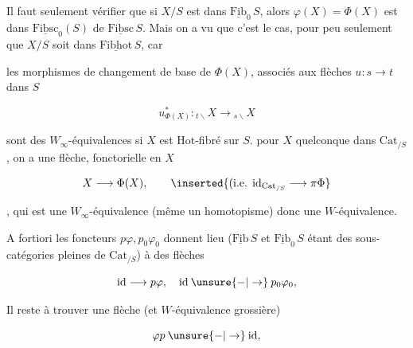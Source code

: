 Il faut seulement vérifier que si $X/S$ est dans $\underline{\mathrm{Fib}}_0\,S$, alors $\varphi(X)=\Phi(X)$ est dans  $\underline{\mathrm{Fibsc}}_0(S)$ de $\underline{\mathrm{Fibsc}}\,S$. Mais on a vu que c'est le cas, pour peu seulement que $X/S$ soit dans $\underline{\mathrm{Fibhot}}\,S$, car 


 les morphismes de changement de base de $\Phi(X)$, associés aux flèches $u:s\longrightarrow t$ dans $S$

\[
 u^*_{\Phi(X)}:{}_{t\backslash}X\longrightarrow{}_{s\backslash}X
\]

sont des $W_\infty$-équivalences si $X$ est $\mathrm{Hot}$-fibré sur $S$.   pour $X$ quelconque dans $\mathrm{Cat}_{/S}$, on a une flèche, fonctorielle en $X$

\[
 X\longrightarrow\Phi(X),\qquad\inserted{(\text{i.e. }\mathrm{id}_{\mathrm{Cat}_{/S}}\longrightarrow\pi\Phi}
\]

, qui est une $W_\infty$-équivalence (même un homotopisme) donc une $W$-équivalence.

A fortiori les foncteurs $p\varphi,p_0\varphi_0$ donnent lieu ($\underline{\mathrm{Fib}}\,S$ et $\underline{\mathrm{Fib}}_0\,S$ étant des sous-catégories pleines de $\mathrm{Cat}_{/S}$) à des flèches

\[
 \mathrm{id}\longrightarrow p\varphi,\quad\mathrm{id}\mathbin{\unsure{-|\to}}p_0\varphi_0,
\]

Il reste à trouver une flèche (et $W$-équivalence grossière)

\[
 \varphi p\mathbin{\unsure{-|\to}}\mathrm{id},
\]


